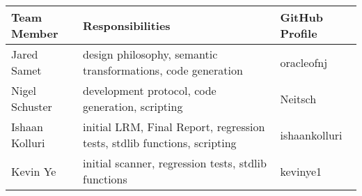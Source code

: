\begin{tabular}{ | l | l | l |}\hline
  Team Member  & Responsibilities      & GitHub Profile\\ \hline
  Jared Samet & design philosophy, semantic transformations, code generation  & oracleofnj\\
  Nigel Schuster & development protocol, code generation, scripting  & Neitsch\\
  Ishaan Kolluri & initial LRM, Final Report, regression tests, stdlib functions, scripting & ishaankolluri\\
  Kevin Ye & initial scanner, regression tests, stdlib functions & kevinye1\\ \hline

\end{tabular}

